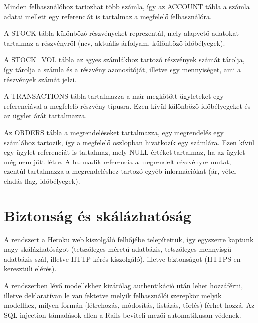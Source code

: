 \bigskip

Minden felhasználóhoz tartozhat több számla, így az ACCOUNT tábla a számla adatai mellett egy referenciát is tartalmaz a megfelelő felhasználóra.

\bigskip

A STOCK tábla különböző részvényeket reprezentál, mely alapvető adatokat tartalmaz a részvényről (név, aktuális árfolyam, különböző időbélyegek).

\bigskip

A STOCK\_VOL tábla az egyes számlákhoz tartozó részvények számát tárolja, így tárolja a számla és a részvény azonosítóját, illetve egy mennyiséget, ami a részvények számát jelzi.

\bigskip

A TRANSACTIONS tábla tartalmazza a már megkötött ügyleteket egy referenciával a megfelelő részvény típusra. Ezen kívül különböző időbélyegeket és az ügylet árát tartalmazza.

\bigskip

Az ORDERS tábla a megrendeléseket tartalmazza, egy megrendelés egy számlához tartozik, így a megfelelő oszlopban hivatkozik egy számlára. Ezen kívül egy ügylet referenciát is tartalmaz, mely NULL értéket tartalmaz, ha az ügylet még nem jött létre. A harmadik referencia a megrendelt részvényre mutat, ezentúl tartalmazza a megrendeléshez tartozó egyéb információkat (ár, vétel-eladás flag, időbélyegek).

\section{Biztonság és skálázhatóság}\label{sect:rsz_funkciok}
A rendszert a Heroku web kiszolgáló felhőjébe telepítettük, így egyszerre kaptunk nagy skálázhatóságot (tetszőleges méretű adatbázis, tetszőleges mennyisgű adatbázis szál, illetve HTTP kérés kiszolgáló), illetve biztonságot (HTTPS-en keresztüli elérés).

\bigskip

A rendszerben lévő modellekhez kizárólag authentikáció után lehet hozzáférni, illetve deklaratívan le van fektetve melyik felhasználói szerepkör melyik modellhez, milyen formán (létrehozás, módosítás, listázás, törlés) férhet hozzá. Az SQL injection támadások ellen a Rails beviteli mezői automatikusan védenek.

